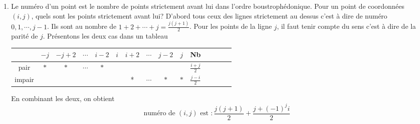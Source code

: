\begin{enumerate}
\begin{enumerate}
\item Le numéro d'un point est le nombre de points strictement avant lui dans l'ordre boustrophédonique. Pour un point de coordonnées $(i,j)$, quels sont les points strictement avant lui?\newline
D'abord tous ceux des lignes strictement au dessus c'est à dire de numéro $0,1,\cdots, j-1$. Ils sont au nombre de $1+2+\cdots+j=\frac{j(j+1)}{2}$.\newline
Pour les points de la ligne $j$, il faut tenir compte du sens c'est à dire de la parité de $j$. Présentons les deux cas dans un tableau
\begin{center}
\renewcommand{\arraystretch}{1.8}
\begin{tabular}{c|c|c|c|c|c|c|c|c|c|c|c|c|c|c}
       & $-j$ & $-j+2$ & $\cdots$ & $i-2$ & $i$ & $i+2$ & $\cdots$ & $j-2$ & $j$ & Nb   \\ \hline
pair   & $*$    & $*$  & $\cdots$ & $*$   &     &       &          &       &     & $\frac{i+j}{2}$\\ \hline
impair &      &        &          &       &     & *     & $\cdots$ & $*$   & $*$   & $\frac{j-i}{2}$
\end{tabular}
\end{center}
En combinant les deux, on obtient
\begin{displaymath}
  \text{ numéro de $(i,j)$ est }: \frac{j(j+1)}{2} + \frac{j+(-1)^ji}{2}
\end{displaymath}


\end{enumerate}
\end{enumerate}
